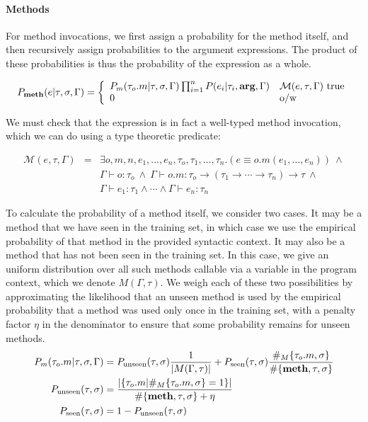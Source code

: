 \documentclass{article} %
\begin{document}
\paragraph{Methods} For method invocations, we first assign a probability for the method itself, and then recursively assign probabilities to the argument expressions. The product of these probabilities is thus the probability of the expression as a whole.

$$P_{\textbf{meth}}(e | \tau, \sigma, \Gamma) = 
\left\{
	\begin{array}{ll}
          P_m(\tau_o.m | \tau, \sigma, \Gamma) \prod_{i=1}^n P(e_i | \tau_i, \textbf{arg}, \Gamma)  & \mathcal{M}(e, \tau, \Gamma)\mbox{ true} \\
	0 & \mbox{o/w}
	\end{array}
\right.$$

We must check that the expression is in fact a well-typed method invocation, which we can do using a type theoretic predicate:

$$\begin{array}{lll}
\mathcal{M}(e, \tau, \Gamma) & = & \exists o, m, n, e_1, \ldots, e_n, \tau_o, \tau_1, \ldots, \tau_n. (e \equiv o.m(e_1, \ldots, e_n))~\land\\
 & & 
\Gamma \vdash o : \tau_o~\land~\Gamma \vdash o.m : \tau_o \rightarrow (\tau_1 \rightarrow \cdots \rightarrow \tau_n) \rightarrow \tau~\land~\\
 & & \Gamma \vdash e_1 : \tau_1 \land \cdots \land \Gamma \vdash e_n : \tau_n
\end{array}$$

To calculate the probability of a method itself, we consider two cases. It may be a method that we have seen in the training set, in which case we use the empirical probability of that method in the provided syntactic context. It may also be a method that has not been seen in the training set. In this case, we give an uniform distribution over all such methods callable via a variable in the program context, which we denote $M(\Gamma, \tau)$. We weigh each of these two possibilities by approximating the likelihood that an unseen method is used by the empirical probability that a method was used only once in the training set, with a penalty factor $\eta$ in the denominator to ensure that some probability remains for unseen methods. 
\begin{align*}
P_m(\tau_o.m | \tau, \sigma, \Gamma) & =  P_{\text{unseen}}(\tau, \sigma)\frac{1}{|M(\Gamma, \tau)|} + 
P_{\text{seen}}(\tau, \sigma)\frac{\#_M\{\tau_o.m, \sigma\}}{\#\{\textbf{meth}, \tau, \sigma\}}\\
P_{\text{unseen}}(\tau, \sigma) & =  \frac{ |\{\tau_o.m | \#_M\{\tau_o.m, \sigma\} = 1\}|}{\#\{\textbf{meth}, \tau, \sigma\} + \eta}\\
P_{\text{seen}}(\tau, \sigma) & =  1 - P_{\text{unseen}}(\tau, \sigma)
\end{align*}
\end{document}

